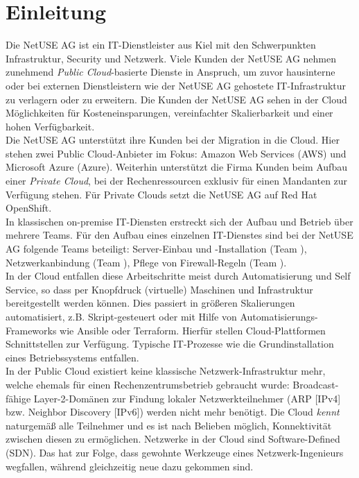 \chapter{Einleitung}

Die NetUSE AG ist ein IT-Dienstleister aus Kiel mit den Schwerpunkten Infrastruktur, Security und Netzwerk. Viele Kunden der NetUSE AG nehmen zunehmend \textit{Public Cloud}-basierte Dienste in Anspruch, um zuvor hausinterne oder bei externen Dienstleistern wie der NetUSE AG gehostete IT-Infrastruktur zu verlagern oder zu erweitern. Die Kunden der NetUSE AG sehen in der Cloud Möglichkeiten für Kosteneinsparungen, vereinfachter Skalierbarkeit und einer hohen Verfügbarkeit.\\
Die NetUSE AG unterstützt ihre Kunden bei der Migration in die Cloud. Hier stehen zwei Public Cloud-Anbieter im Fokus: Amazon Web Services (AWS) und Microsoft Azure (Azure). Weiterhin unterstützt die Firma Kunden beim Aufbau einer \textit{Private Cloud}, bei der Rechenressourcen exklusiv für einen Mandanten zur Verfügung stehen. Für Private Clouds setzt die NetUSE AG auf Red Hat OpenShift.\\
In klassischen on-premise IT-Diensten erstreckt sich der Aufbau und Betrieb über mehrere Teams. Für den Aufbau eines einzelnen IT-Dienstes sind bei der NetUSE AG folgende Teams beteiligt: Server-Einbau und -Installation (Team \grqq{}), Netzwerkanbindung (Team \grqq{}), Pflege von Firewall-Regeln (Team \grqq{}).\\
In der Cloud entfallen diese Arbeitschritte meist durch Automatisierung und Self Service, so dass per Knopfdruck (virtuelle) Maschinen und Infrastruktur bereitgestellt werden können\cite{Karlstetter2017a}. Dies passiert in größeren Skalierungen automatisiert, z.B. Skript-gesteuert oder mit Hilfe von Automatisierungs-Frameworks wie Ansible oder Terraform. Hierfür stellen Cloud-Plattformen Schnittstellen zur Verfügung\cite{edelman2018}\cite{Brikman2019}. Typische IT-Prozesse wie die Grundinstallation eines Betriebssystems entfallen.\\
In der Public Cloud existiert keine klassische Netzwerk-Infrastruktur mehr, welche ehemals für einen Rechenzentrumsbetrieb gebraucht wurde: Broadcast-fähige Layer-2-Domänen zur Findung lokaler Netzwerkteilnehmer (ARP [IPv4] bzw. Neighbor Discovery [IPv6]) werden nicht mehr benötigt. Die Cloud \textit{kennt} naturgemäß alle Teilnehmer und es ist nach Belieben möglich, Konnektivität zwischen diesen zu ermöglichen. Netzwerke in der Cloud sind Software-Defined (SDN)\cite{Seidel2015}. Das hat zur Folge, dass gewohnte Werkzeuge eines Netzwerk-Ingenieurs wegfallen, während gleichzeitig neue dazu gekommen sind.

